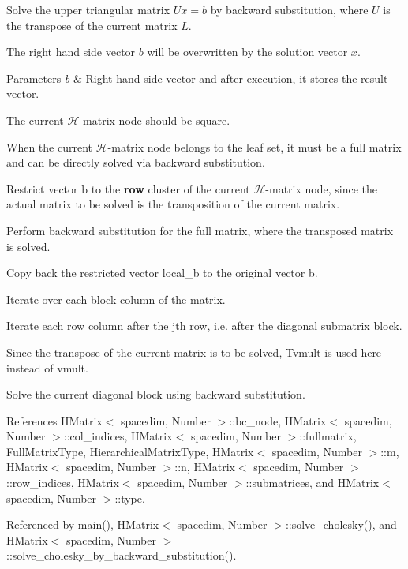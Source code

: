 Solve the upper triangular matrix $Ux=b$ by backward substitution, where $U$ is the transpose of the current matrix $L$.

The right hand side vector $b$ will be overwritten by the solution vector $x$.


\begin{DoxyParams}{Parameters}
{\em b} & Right hand side vector and after execution, it stores the result vector. \\
\hline
\end{DoxyParams}
The current $\mathcal{H}$-\/matrix node should be square.

When the current $\mathcal{H}$-\/matrix node belongs to the leaf set, it must be a full matrix and can be directly solved via backward substitution.

Restrict vector {\ttfamily b} to the {\bfseries row} cluster of the current $\mathcal{H}$-\/matrix node, since the actual matrix to be solved is the transposition of the current matrix.

Perform backward substitution for the full matrix, where the transposed matrix is solved.

Copy back the restricted vector {\ttfamily local\+\_\+b} to the original vector {\ttfamily b}.

Iterate over each block column of the matrix.

Iterate each row column after the j\textquotesingle{}th row, i.\+e. after the diagonal submatrix block.

Since the transpose of the current matrix is to be solved, {\ttfamily Tvmult} is used here instead of {\ttfamily vmult}.

Solve the current diagonal block using backward substitution.

References H\+Matrix$<$ spacedim, Number $>$\+::bc\+\_\+node, H\+Matrix$<$ spacedim, Number $>$\+::col\+\_\+indices, H\+Matrix$<$ spacedim, Number $>$\+::fullmatrix, Full\+Matrix\+Type, Hierarchical\+Matrix\+Type, H\+Matrix$<$ spacedim, Number $>$\+::m, H\+Matrix$<$ spacedim, Number $>$\+::n, H\+Matrix$<$ spacedim, Number $>$\+::row\+\_\+indices, H\+Matrix$<$ spacedim, Number $>$\+::submatrices, and H\+Matrix$<$ spacedim, Number $>$\+::type.



Referenced by main(), H\+Matrix$<$ spacedim, Number $>$\+::solve\+\_\+cholesky(), and H\+Matrix$<$ spacedim, Number $>$\+::solve\+\_\+cholesky\+\_\+by\+\_\+backward\+\_\+substitution().

\mbox{\label{classHMatrix_a880948492a7df252f3696219f6966703}} 
